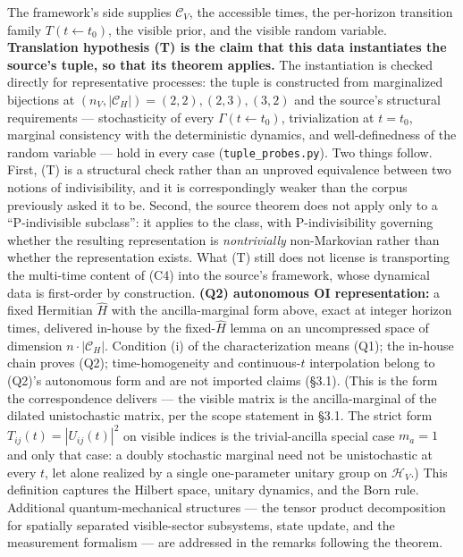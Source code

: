 \documentclass[
]{article}
\begin{document}
The framework's side supplies \(\mathcal{C}_V\), the accessible times,
the per-horizon transition family \(T(t \leftarrow t_0)\), the visible
prior, and the visible random variable. \textbf{Translation hypothesis
(T) is the claim that this data instantiates the source's tuple, so that
its theorem applies.} The instantiation is checked directly for
representative processes: the tuple is constructed from marginalized
bijections at \((n_V, |\mathcal{C}_H|) = (2,2), (2,3), (3,2)\) and the
source's structural requirements --- stochasticity of every
\(\Gamma(t \leftarrow t_0)\), trivialization at \(t = t_0\), marginal
consistency with the deterministic dynamics, and well-definedness of the
random variable --- hold in every case (\texttt{tuple\_probes.py}). Two
things follow. First, (T) is a structural check rather than an unproved
equivalence between two notions of indivisibility, and it is
correspondingly weaker than the corpus previously asked it to be.
Second, the source theorem does not apply only to a ``P-indivisible
subclass'': it applies to the class, with P-indivisibility governing
whether the resulting representation is \emph{nontrivially}
non-Markovian rather than whether the representation exists. What (T)
still does not license is transporting the multi-time content of (C4)
into the source's framework, whose dynamical data is first-order by
construction. \textbf{(Q2) autonomous OI representation:} a fixed
Hermitian \(\hat{H}\) with the ancilla-marginal form above, exact at
integer horizon times, delivered in-house by the fixed-\(\hat{H}\) lemma
on an uncompressed space of dimension \(n \cdot |\mathcal{C}_H|\).
Condition (i) of the characterization means (Q1); the in-house chain
proves (Q2); time-homogeneity and continuous-\(t\) interpolation belong
to (Q2)'s autonomous form and are not imported claims (§3.1). (This is
the form the correspondence delivers --- the visible matrix is the
ancilla-marginal of the dilated unistochastic matrix, per the scope
statement in §3.1. The strict form \(T_{ij}(t) = |U_{ij}(t)|^2\) on
visible indices is the trivial-ancilla special case \(m_a = 1\) and only
that case: a doubly stochastic marginal need not be unistochastic at
every \(t\), let alone realized by a single one-parameter unitary group
on \(\mathcal{H}_V\).) This definition captures the Hilbert space,
unitary dynamics, and the Born rule. Additional quantum-mechanical
structures --- the tensor product decomposition for spatially separated
visible-sector subsystems, state update, and the measurement formalism
--- are addressed in the remarks following the theorem.
\end{document}
